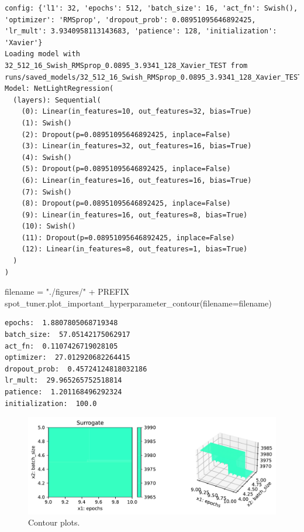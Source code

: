 \documentclass[
  letterpaper,
  DIV=11,
  numbers=noendperiod]{scrreprt}
\newenvironment{Shaded}{\begin{snugshade}}{\end{snugshade}}
\newcommand{\NormalTok}[1]{\textcolor[rgb]{0.00,0.23,0.31}{#1}}
\newcommand{\OperatorTok}[1]{\textcolor[rgb]{0.37,0.37,0.37}{#1}}
\newcommand{\StringTok}[1]{\textcolor[rgb]{0.13,0.47,0.30}{#1}}
\begin{document}
\begin{verbatim}
config: {'l1': 32, 'epochs': 512, 'batch_size': 16, 'act_fn': Swish(), 'optimizer': 'RMSprop', 'dropout_prob': 0.08951095646892425, 'lr_mult': 3.9340958113143683, 'patience': 128, 'initialization': 'Xavier'}
Loading model with 32_512_16_Swish_RMSprop_0.0895_3.9341_128_Xavier_TEST from runs/saved_models/32_512_16_Swish_RMSprop_0.0895_3.9341_128_Xavier_TEST/last.ckpt
Model: NetLightRegression(
  (layers): Sequential(
    (0): Linear(in_features=10, out_features=32, bias=True)
    (1): Swish()
    (2): Dropout(p=0.08951095646892425, inplace=False)
    (3): Linear(in_features=32, out_features=16, bias=True)
    (4): Swish()
    (5): Dropout(p=0.08951095646892425, inplace=False)
    (6): Linear(in_features=16, out_features=16, bias=True)
    (7): Swish()
    (8): Dropout(p=0.08951095646892425, inplace=False)
    (9): Linear(in_features=16, out_features=8, bias=True)
    (10): Swish()
    (11): Dropout(p=0.08951095646892425, inplace=False)
    (12): Linear(in_features=8, out_features=1, bias=True)
  )
)
\end{verbatim}

\begin{Shaded}
\begin{Highlighting}[]
\NormalTok{filename }\OperatorTok{=} \StringTok{"./figures/"} \OperatorTok{+}\NormalTok{ PREFIX}
\NormalTok{spot\_tuner.plot\_important\_hyperparameter\_contour(filename}\OperatorTok{=}\NormalTok{filename)}
\end{Highlighting}
\end{Shaded}

\begin{verbatim}
epochs:  1.8807805068719348
batch_size:  57.05142175062917
act_fn:  0.1107426719028105
optimizer:  27.012920682264415
dropout_prob:  0.45724124818032186
lr_mult:  29.965265752518814
patience:  1.201168496292324
initialization:  100.0
\end{verbatim}

\begin{figure}[H]

{\centering \includegraphics{031_spot_lightning_linear_diabetes_files/figure-pdf/cell-19-output-2.pdf}

}

\caption{Contour plots.}

\end{figure}%
\end{document}
